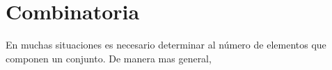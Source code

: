 \documentclass[14pt]{extbook}
\begin{document}


\chapter{Combinatoria}

En muchas situaciones es necesario determinar al número de elementos que componen un conjunto. De manera mas general, 
\end{document}
